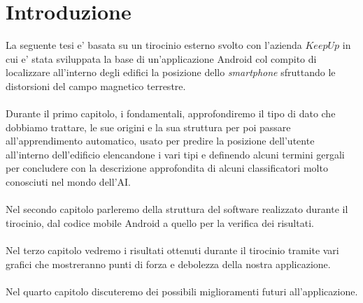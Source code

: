 \chapter{Introduzione}
La seguente tesi e' basata su un tirocinio esterno svolto con l'azienda $KeepUp$ in cui e' stata sviluppata la base di un'applicazione Android col compito di localizzare all'interno degli edifici la posizione dello \textit{smartphone} sfruttando le distorsioni del campo magnetico terrestre.
\\\\
Durante il primo capitolo, i fondamentali, approfondiremo il tipo di dato che dobbiamo trattare, le sue origini e la sua struttura per poi passare all'apprendimento automatico, usato per predire la posizione dell'utente all'interno dell'edificio elencandone i vari tipi e definendo alcuni termini gergali per concludere con la descrizione approfondita di alcuni classificatori molto conosciuti nel mondo dell'AI.
\\\\
Nel secondo capitolo parleremo della struttura del software realizzato durante il tirocinio, dal codice mobile Android a quello per la verifica dei risultati.
\\\\
Nel terzo capitolo vedremo i risultati ottenuti durante il tirocinio tramite vari grafici che mostreranno punti di forza e debolezza della nostra applicazione.
\\\\
Nel quarto capitolo discuteremo dei possibili miglioramenti futuri all'applicazione.